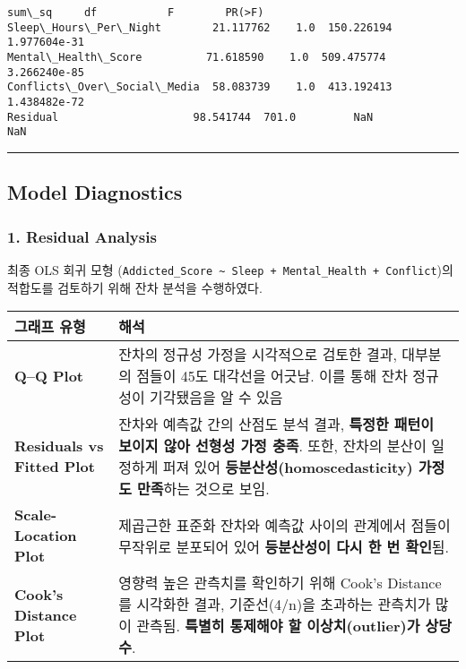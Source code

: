 \documentclass[11pt]{article}
\makeatletter
\newcommand{\boxspacing}{\kern\kvtcb@left@rule\kern\kvtcb@boxsep}
\newcommand{\prompt}[4]{
        {\ttfamily\llap{{\color{#2}[#3]:\hspace{3pt}#4}}\vspace{-\baselineskip}}
    }
\makeatother
\begin{document}
            \begin{tcolorbox}[breakable, size=fbox, boxrule=.5pt, pad at break*=1mm, opacityfill=0]
\prompt{Out}{outcolor}{8}{\boxspacing}
\begin{Verbatim}[commandchars=\\\{\}]
                                sum\_sq     df           F        PR(>F)
Sleep\_Hours\_Per\_Night        21.117762    1.0  150.226194  1.977604e-31
Mental\_Health\_Score          71.618590    1.0  509.475774  3.266240e-85
Conflicts\_Over\_Social\_Media  58.083739    1.0  413.192413  1.438482e-72
Residual                     98.541744  701.0         NaN           NaN
\end{Verbatim}
\end{tcolorbox}
        
    \begin{center}\rule{0.5\linewidth}{0.5pt}\end{center}

\subsection{Model Diagnostics}\label{model-diagnostics}

\subsubsection{1. Residual Analysis}\label{residual-analysis}

최종 OLS 회귀 모형
(\texttt{Addicted\_Score\ \textasciitilde{}\ Sleep\ +\ Mental\_Health\ +\ Conflict})의
적합도를 검토하기 위해 잔차 분석을 수행하였다.

\begin{longtable}[]{@{}
  >{\raggedright\arraybackslash}p{}
  >{\raggedright\arraybackslash}p{}@{}}
\toprule\noalign{}
\begin{minipage}[b]{\linewidth}\raggedright
그래프 유형
\end{minipage} & \begin{minipage}[b]{\linewidth}\raggedright
해석
\end{minipage} \\
\midrule\noalign{}
\endhead
\bottomrule\noalign{}
\endlastfoot
\textbf{Q--Q Plot} & 잔차의 정규성 가정을 시각적으로 검토한 결과,
대부분의 점들이 45도 대각선을 어긋남. 이를 통해 잔차 정규성이 기각됐음을
알 수 있음 \\
\textbf{Residuals vs Fitted Plot} & 잔차와 예측값 간의 산점도 분석 결과,
\textbf{특정한 패턴이 보이지 않아 선형성 가정 충족}. 또한, 잔차의 분산이
일정하게 퍼져 있어 \textbf{등분산성(homoscedasticity) 가정도 만족}하는
것으로 보임. \\
\textbf{Scale-Location Plot} & 제곱근한 표준화 잔차와 예측값 사이의
관계에서 점들이 무작위로 분포되어 있어 \textbf{등분산성이 다시 한 번
확인}됨. \\
\textbf{Cook's Distance Plot} & 영향력 높은 관측치를 확인하기 위해
Cook's Distance를 시각화한 결과, 기준선(4/n)을 초과하는 관측치가 많이
관측됨. \textbf{특별히 통제해야 할 이상치(outlier)가 상당수}. \\
\end{longtable}
\end{document}

